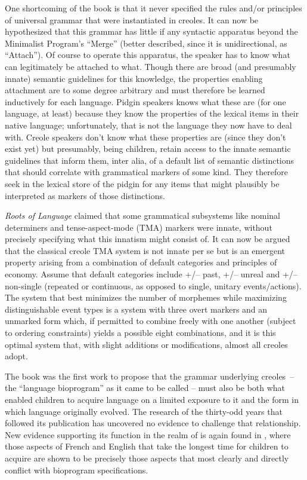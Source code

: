One shortcoming of the book is that it never specified the rules and/or principles of universal grammar that were instantiated in creoles. It can now be hypothesized that this grammar has little if any syntactic apparatus beyond the Minimalist Program’s “Merge” (better described, since it is unidirectional, as “Attach”). Of course to operate this apparatus, the speaker has to know what can legitimately be attached to what. Though there are broad (and presumably innate) semantic guidelines for this knowledge, the properties enabling attachment are to some degree arbitrary and must therefore be learned inductively for each language. Pidgin speakers knows what these are (for one language, at least) because they know the properties of the lexical items in their native language; unfortunately, that is not the language they now have to deal with. Creole speakers don’t know what these properties are (since they don’t exist yet) but presumably, being children, retain access to the innate semantic guidelines that inform them, inter alia, of a default list of semantic distinctions that should correlate with grammatical markers of some kind. They therefore seek in the lexical store of the pidgin for any items that might plausibly be interpreted as markers of those distinctions.

\textit{Roots of Language} claimed that some grammatical subsystems like nominal determiners and tense-aspect-mode (TMA) markers were innate, without precisely specifying what this innatism might consist of. It can now be argued that the classical creole TMA system is not innate per se but is an emergent property arising from a combination of default categories and principles of economy. Assume that default categories include +/– past, +/– unreal and +/– non-single (repeated or continuous, as opposed to single, unitary events/actions). The system that best minimizes the number of morphemes while maximizing distinguishable event types is a system with three overt markers and an unmarked form which, if permitted to combine freely with one another (subject to ordering constraints) yields a possible eight combinations, and it is this optimal system that, with slight additions or modifications, almost all creoles adopt.

The book was the first work to propose that the grammar underlying creoles~-- the “language bioprogram” as it came to be called -- must also be both what enabled children to acquire language on a limited exposure to it and the form in which language originally evolved. The research of the thirty-odd years that followed its publication has uncovered no evidence to challenge that relationship. New evidence supporting its function in the realm of is again found in \citet[Chapter 7]{Bickerton2014}, where those aspects of French and English that take the longest time for children to acquire are shown to be precisely those aspects that most clearly and directly conflict with bioprogram specifications.


